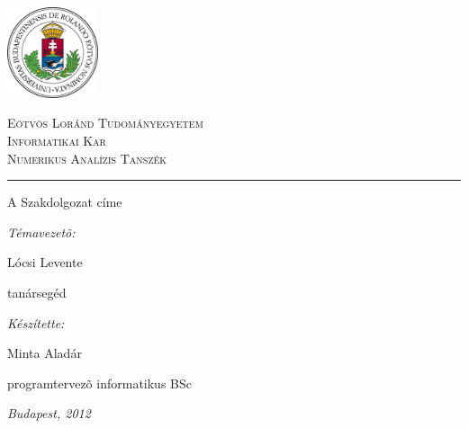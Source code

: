 \begin{titlepage}

\noindent
\parbox[m]{0.2\textwidth}{
 \includegraphics[width=0.2\textwidth]{elte_cimer_szines.eps} %
}
\hfill
\parbox[m]{0.7\textwidth}{
\begin{center}
\begin{large}
\textsc{
Eötvös Loránd Tudományegyetem\\
\vspace{0.5pc}
Informatikai Kar\\
\vspace{0.5pc}
Numerikus Analízis Tanszék\\
}
\end{large}
\end{center}
}

\vspace{1pc}
\hrule

\vfill

\begin{center}
{\LARGE A Szakdolgozat címe}
\end{center}

\vfill

\noindent
\hspace*{0.05\textwidth}
\parbox{0.45\textwidth}{
{\it Témavezetõ:}
\bigskip

{\Large Lócsi Levente}
\smallskip

tanársegéd
}
\hfill
\parbox{0.45\textwidth}{
{\it Készítette:}
\bigskip

{\Large Minta Aladár}
\smallskip

programtervezõ informatikus BSc
}


\vfill

\begin{center}
{\large {\it Budapest, 2012}}
\end{center}

\end{titlepage}
